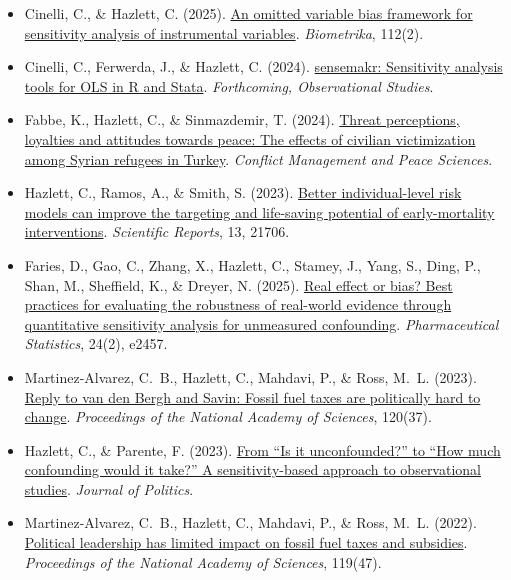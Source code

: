 \documentclass[11pt]{article}
\newcommand{\pubitem}[1]{\item #1}
\begin{document}
\begin{itemize}
\pubitem{Cinelli, C., \& Hazlett, C. (2025). \href{https://chadhazlett.com/publications.html#cinelli_hazlett_2025_iv_sensitivity}{An omitted variable bias framework for sensitivity analysis of instrumental variables}. \textit{Biometrika}, 112(2).}

\pubitem{Cinelli, C., Ferwerda, J., \& Hazlett, C. (2024). \href{https://chadhazlett.com/publications.html#cinelli_ferwerda_hazlett_2024_sensemakr}{sensemakr: Sensitivity analysis tools for OLS in R and Stata}. \textit{Forthcoming, Observational Studies}.}

\pubitem{Fabbe, K., Hazlett, C., \& Sinmazdemir, T. (2024). \href{https://chadhazlett.com/publications.html#fabbe_hazlett_sinmazdemir_2024_threat}{Threat perceptions, loyalties and attitudes towards peace: The effects of civilian victimization among Syrian refugees in Turkey}. \textit{Conflict Management and Peace Sciences}.}

\pubitem{Hazlett, C., Ramos, A., \& Smith, S. (2023). \href{https://chadhazlett.com/publications.html#hazlett_ramos_smith_2023_infant_mortality}{Better individual-level risk models can improve the targeting and life-saving potential of early-mortality interventions}. \textit{Scientific Reports}, 13, 21706.}

\pubitem{Faries, D., Gao, C., Zhang, X., Hazlett, C., Stamey, J., Yang, S., Ding, P., Shan, M., Sheffield, K., \& Dreyer, N. (2025). \href{https://chadhazlett.com/publications.html#faries_2025_real_effect_bias}{Real effect or bias? Best practices for evaluating the robustness of real-world evidence through quantitative sensitivity analysis for unmeasured confounding}. \textit{Pharmaceutical Statistics}, 24(2), e2457.}

\pubitem{Martinez-Alvarez, C.~B., Hazlett, C., Mahdavi, P., \& Ross, M.~L. (2023). \href{https://chadhazlett.com/publications.html#martinezalvarez_2023_reply_fossil}{Reply to van den Bergh and Savin: Fossil fuel taxes are politically hard to change}. \textit{Proceedings of the National Academy of Sciences}, 120(37).}

\pubitem{Hazlett, C., \& Parente, F. (2023). \href{https://chadhazlett.com/publications.html#hazlett_parente_2023_confounding}{From ``Is it unconfounded?'' to ``How much confounding would it take?'' A sensitivity-based approach to observational studies}. \textit{Journal of Politics}.}

\pubitem{Martinez-Alvarez, C.~B., Hazlett, C., Mahdavi, P., \& Ross, M.~L. (2022). \href{https://chadhazlett.com/publications.html#martinezalvarez_2022_political_leadership}{Political leadership has limited impact on fossil fuel taxes and subsidies}. \textit{Proceedings of the National Academy of Sciences}, 119(47).}


\end{itemize}
\end{document}
